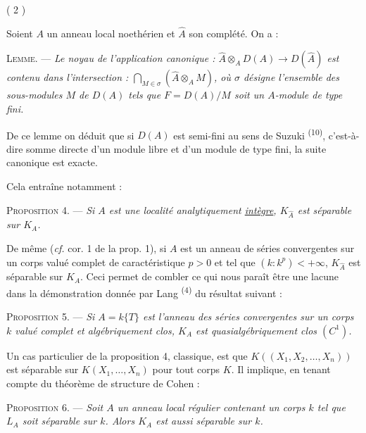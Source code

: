\begin{center}( 2 )\end{center}

Soient $A$ un anneau local noethérien et $\widehat A$ son complété. On a :

\textsc{Lemme.} --- \textit{Le noyau de l'application canonique : $\widehat A\otimes_A D(A)\to D(\widehat A)$ est contenu dans l'intersection : $\displaystyle\bigcap_{M\in\sigma}\left(\widehat A\otimes_A M\right)$, où $\sigma$ désigne l'ensemble des sous-modules $M$ de $D(A)$ tels que $F=D(A)/M$ soit un $A$-module de type fini.}

De ce lemme on déduit que si $D(A)$ est semi-fini au sens de Suzuki \textsuperscript{(10)}, c'est-à-dire somme directe d'un module libre et d'un module de type fini, la suite canonique
est exacte.

Cela entraîne notamment :

\textsc{Proposition 4.} --- \textit{Si $A$ est une localité analytiquement \uline{intègre}, $K_{\widehat A}$ est séparable sur $K_A$.}

De même (\textit{cf.} cor. 1 de la prop. 1), si $A$ est un anneau de séries convergentes sur un corps valué complet de caractéristique $p>0$ et tel que $(k:k^p)<+\infty$, $K_{\widehat A}$ est séparable sur $K_A$. Ceci permet de combler ce qui nous paraît être une lacune dans la démonstration donnée par Lang \textsuperscript{(4)} du résultat suivant :

\textsc{Proposition 5.} --- \textit{Si $A=k\{T\}$ est l'anneau des séries convergentes sur un corps $k$ valué complet et algébriquement clos, $K_A$ est quasialgébriquement clos $(C^1)$.}

Un cas particulier de la proposition 4, classique, est que $K((X_1,X_2,\ldots,X_n))$ est séparable sur $K(X_1,\ldots,X_n)$ pour tout corps $K$. Il implique, en tenant compte du théorème de structure de Cohen :

\textsc{Proposition 6.} --- \textit{Soit $A$ un anneau local régulier contenant un corps $k$ tel que $L_A$ soit séparable sur $k$. Alors $K_A$ est aussi séparable sur $k$.}

